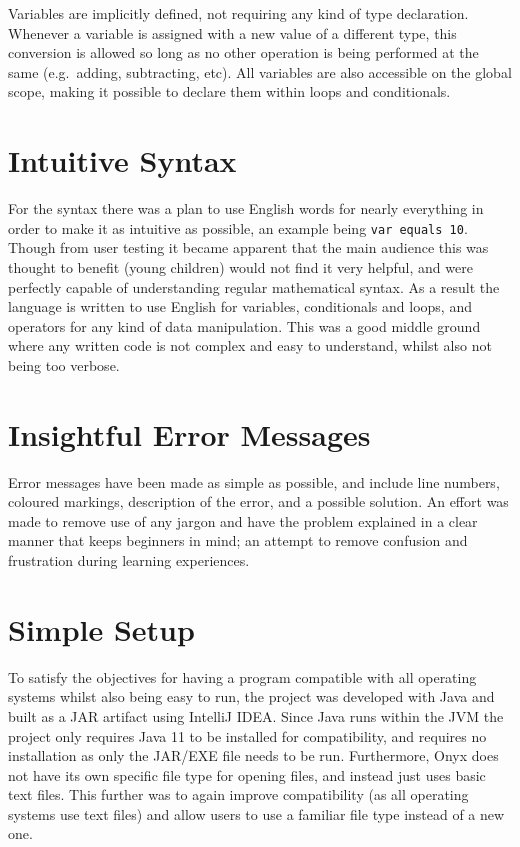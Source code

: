 \documentclass[
]{report}
\begin{document}
Variables are implicitly defined, not requiring any kind of type
declaration. Whenever a variable is assigned with a new value of a
different type, this conversion is allowed so long as no other operation
is being performed at the same (e.g.~adding, subtracting, etc). All
variables are also accessible on the global scope, making it possible to
declare them within loops and conditionals.

\section{Intuitive Syntax}
For the syntax there was a plan to use English words for nearly
everything in order to make it as intuitive as possible, an example
being \texttt{var\ equals\ 10}. Though from user testing it became
apparent that the main audience this was thought to benefit (young
children) would not find it very helpful, and were perfectly capable of
understanding regular mathematical syntax. As a result the language is
written to use English for variables, conditionals and loops, and
operators for any kind of data manipulation. This was a good middle
ground where any written code is not complex and easy to understand,
whilst also not being too verbose.

\section{Insightful Error Messages}
Error messages have been made as simple as possible, and include line
numbers, coloured markings, description of the error, and a possible
solution. An effort was made to remove use of any jargon and have the
problem explained in a clear manner that keeps beginners in mind; an
attempt to remove confusion and frustration during learning experiences.

\section{Simple Setup}
To satisfy the objectives for having a program compatible with all
operating systems whilst also being easy to run, the project was
developed with Java and built as a JAR artifact using IntelliJ IDEA.
Since Java runs within the JVM the project only requires Java 11 to be
installed for compatibility, and requires no installation as only the
JAR/EXE file needs to be run. Furthermore, Onyx does not have its own
specific file type for opening files, and instead just uses basic text
files. This further was to again improve compatibility (as all operating
systems use text files) and allow users to use a familiar file type
instead of a new one.
\end{document}
